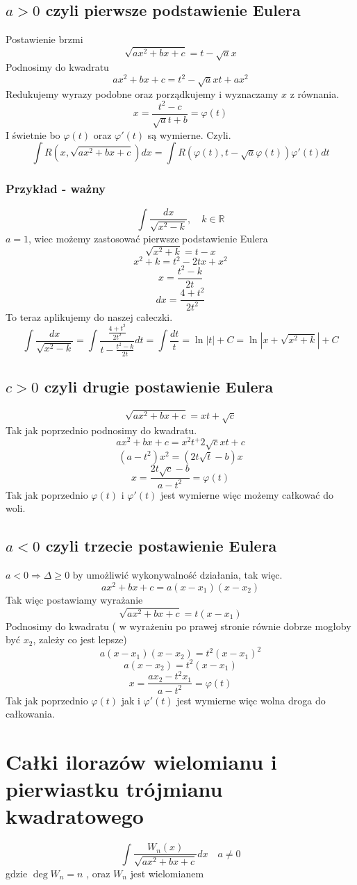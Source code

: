 \documentclass[11pt]{article}
\begin{document}
\subsection{$ a > 0$ czyli pierwsze podstawienie Eulera}
Postawienie brzmi
$$ \sqrt{ax^2 + bx + c} = t - \sqrt{a}x $$
Podnosimy do kwadratu
$$ ax^2 + bx + c = t^2 -\sqrt{a}xt + ax^2 $$
Redukujemy wyrazy podobne oraz porządkujemy i wyznaczamy $x$ z równania.
$$ x = \frac{t^2 -c}{\sqrt{a}t + b} = \varphi(t)$$
I świetnie bo $\varphi(t)$ oraz $\varphi'(t)$ są wymierne. Czyli.
$$\int R(x,\sqrt{ax^2 + bx + c})dx = \int R(\varphi(t), t - \sqrt{a}\varphi(t))\varphi'(t)dt$$
\newpage
\subsubsection{Przykład - ważny}
$$ \int \frac{dx}{\sqrt{x^2-k}} , \quad k \in \mathbb{R} $$
$a = 1$, wiec możemy zastosować pierwsze podstawienie Eulera
$$ \sqrt{x^2+k} = t - x$$
$$ x^2 + k = t^2 -2tx + x^2 $$
$$ x = \frac{t^2 - k}{2t}$$
$$ dx = \frac{4+t^2}{2t^2}$$
To teraz aplikujemy do naszej całeczki.
$$\int \frac{dx}{\sqrt{x^2-k}} = \int \frac{\frac{4+t^2}{2t^2}}{t-\frac{t^2-k}{2t}} dt = \int \frac{dt}{t} = \ln{|t|} + C = \ln{|x + \sqrt{x^2+k} |} + C $$
\subsection{ $ c > 0 $  czyli drugie postawienie Eulera}
$$ \sqrt{ax^2 + bx + c} = xt + \sqrt{c} $$
Tak jak poprzednio podnosimy do kwadratu.
$$ ax^2 + bx + c = x^2t^ + 2\sqrt{c}xt + c$$
$$ (a - t^2)x^2 = (2t\sqrt{t} - b)x $$
$$ x = \frac{2t\sqrt{c} -b}{a -t^2}  = \varphi(t)$$
Tak jak poprzednio $\varphi(t)$ i $\varphi'(t)$ jest wymierne więc możemy całkować do woli.
\subsection{$a<0$ czyli trzecie postawienie Eulera}
$a < 0 \Longrightarrow \Delta \geq 0$ by umożliwić wykonywalność działania, tak więc.
$$ ax^2 + bx + c = a(x - x_1)(x - x_2)$$
Tak więc postawiamy wyrażanie
$$ \sqrt{ax^2 + bx + c} = t(x - x_1)$$
Podnosimy do kwadratu ( w wyrażeniu po prawej stronie równie dobrze mogłoby być $x_2$, zależy co jest lepsze)
$$ a(x - x_1)(x - x_2) = t^2(x-x_1)^2 $$
$$ a(x -x_2) = t^2(x-x_1)$$
$$ x = \frac{ax_2 - t^2x_1}{a - t^2} = \varphi(t)$$
Tak jak poprzednio $ \varphi(t)$ jak i $\varphi'(t)$ jest wymierne więc wolna droga do całkowania.

\section{Całki ilorazów wielomianu i pierwiastku trójmianu kwadratowego}
$$ \int \frac{W_n(x)}{\sqrt{ax^2 + bx + c}} dx \quad a\not=0$$
gdzie $ \deg{W_n} = n $ , oraz $W_n$ jest wielomianem
\end{document}
